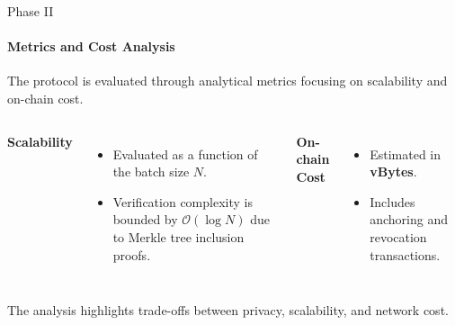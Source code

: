 \begin{frame}{Phase II}
\framesubtitle{Metrics and Cost Analysis}
The protocol is evaluated through analytical metrics focusing on scalability and on-chain cost.
\vspace*{0.3cm}
\begin{columns}[T]
\textbf{Scalability}
\begin{itemize}
    \item Evaluated as a function of the batch size $N$.
    \item Verification complexity is bounded by $\mathcal{O}(\log N)$ due to Merkle tree inclusion proofs.
\end{itemize}

\textbf{On-chain Cost}
\begin{itemize}
    \item Estimated in \textbf{vBytes}.
    \item Includes anchoring and revocation transactions.
\end{itemize}
\end{columns}

\vspace*{0.4cm}
The analysis highlights trade-offs between privacy, scalability, and network cost.
\end{frame}
